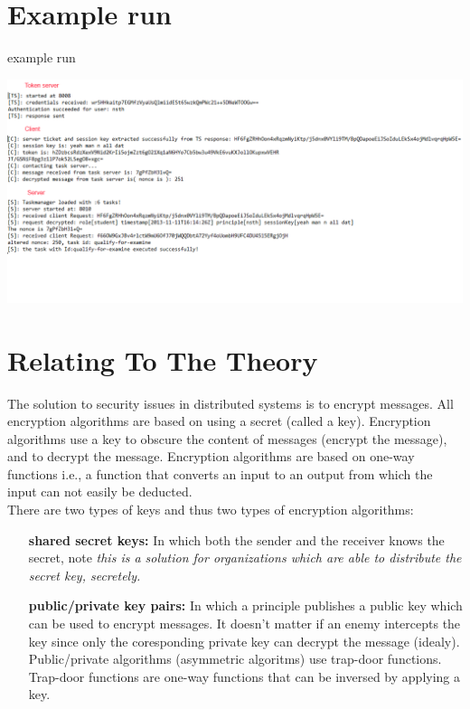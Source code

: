 
\section{Example run}

\begin{center}
\centering
\caption{example run}
\includegraphics[scale=0.5]{images/security_run.png}
\end{center}
\vspace{10pt}

\section{Relating To The Theory}

The solution to security issues in distributed systems is to encrypt messages. All encryption algorithms are based on using a secret (called a key). Encryption algorithms use a key to obscure the content of messages (encrypt the message), and to decrypt the message. Encryption algorithms are based on one-way functions i.e., a function that converts an input to an output from which the input can not easily be deducted. \\ 

There are two types of keys and thus two types of encryption algorithms: \\

\begin{itemize}
\item[  \textbf{shared secret keys:}] In which both the sender and the receiver knows the secret, note \textit{this is a solution for organizations which are able to distribute the secret key, secretely.}

\item[\textbf{public/private key pairs:}] In which a principle publishes a public key which can be used to encrypt messages. It doesn't matter if an enemy intercepts the key since only the coresponding private key can decrypt the message (idealy). Public/private algorithms (asymmetric algoritms) use trap-door functions. Trap-door functions are one-way functions that can be inversed by applying a key.  \\
\end{itemize}

